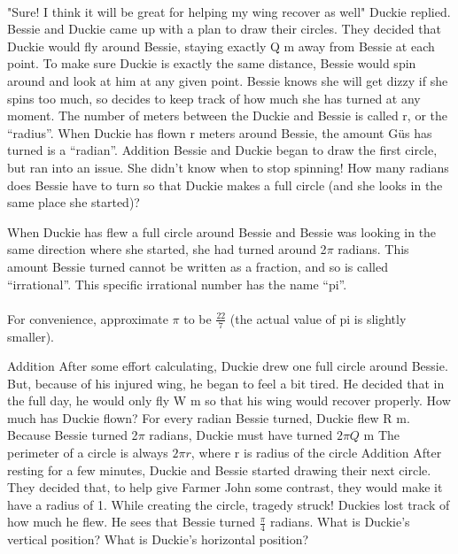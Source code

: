 \paragraph{} "Sure! I think it will be great for helping my wing recover as well" Duckie replied.
\vfill
\pagebreak
 {Bessie and Duckie came up with a plan to draw their circles. They decided that Duckie would fly around Bessie, staying exactly Q m away from Bessie at each point. To make sure Duckie is exactly the same distance, Bessie would spin around and look at him at any given point. Bessie knows she will get dizzy if she spins too much, so decides to keep track of how much she has turned at any moment.}
 {}
 {The number of meters between the Duckie and Bessie is called r, or the “radius”. When Duckie has flown r meters around Bessie, the amount Güs has turned is a “radian”.}
 {Addition}
 {Bessie and Duckie began to draw the first circle, but ran into an issue. She didn't know when to stop spinning! How many radians does Bessie have to turn so that Duckie makes a full circle (and she looks in the same place she started)?}
 {}
 {When Duckie has flew a full circle around Bessie and Bessie was looking in the same direction where she started, she had turned around 2$\pi$ radians. This amount Bessie turned cannot be written as a fraction, and so is called “irrational”. This specific irrational number has the name “pi”. 
 \paragraph{} For convenience, approximate $\pi$ to be $\frac{22}{7}$ (the actual value of pi is slightly smaller).}
 {Addition}
 {After some effort calculating, Duckie drew one full circle around Bessie. But, because of his injured wing, he began to feel a bit tired. He decided that in the full day, he would only fly W m so that his wing would recover properly. How much has Duckie flown?}
 {For every radian Bessie turned, Duckie flew R m. Because Bessie turned 2$\pi$ radians, Duckie must have turned $2\pi Q$ m}
 {The perimeter of a circle is always $2\pi r$, where r is radius of the circle}
 {Addition}
 {After resting for a few minutes, Duckie and Bessie started drawing their next circle. They decided that, to help give Farmer John some contrast, they would make it have a radius of 1. While creating the circle, tragedy struck! Duckies lost track of how much he flew. He sees that Bessie turned $\frac{\pi}{4}$ radians. What is Duckie's vertical position? What is Duckie's horizontal position?}
